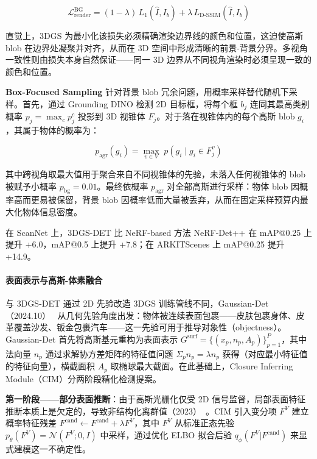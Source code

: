 \begin{equation}
\label{eq:10_bg_loss}
\mathcal{L}_{\text{render}}^{\text{BG}} = (1-\lambda)\, L_1(\hat{I}, I_b) + \lambda\, L_{\text{D-SSIM}}(\hat{I}, I_b)
\end{equation}

直觉上，3DGS 为最小化该损失必须精确渲染边界线的颜色和位置，这迫使高斯 blob 在边界处凝聚并对齐，从而在 3D 空间中形成清晰的前景-背景分界。多视角一致性则由损失本身自然保证——同一 3D 边界从不同视角渲染时必须呈现一致的颜色和位置。

\textbf{Box-Focused Sampling} 针对背景 blob 冗余问题，用概率采样替代随机下采样。首先，通过 Grounding DINO 检测 2D 目标框，将每个框 $b_j$ 连同其最高类别概率 $p_j = \max_c p^c_j$ 投影到 3D 视锥体 $F_j$。对于落在视锥体内的每个高斯 blob $g_i$，其属于物体的概率为：

\begin{equation}
\label{eq:10_prob_agg}
p_{\text{agr}}(g_i) = \max_{v \in V}\; p(g_i \mid g_i \in F_j^v)
\end{equation}

其中跨视角取最大值用于聚合来自不同视锥体的先验，未落入任何视锥体的 blob 被赋予小概率 $p_{\text{bg}}=0.01$。最终依概率 $p_{\text{agr}}$ 对全部高斯进行采样：物体 blob 因概率高而更易被保留，背景 blob 因概率低而大量被丢弃，从而在固定采样预算内最大化物体信息密度。

在 ScanNet 上，3DGS-DET 比 NeRF-based 方法 NeRF-Det++ 在 mAP@0.25 上提升 +6.0，mAP@0.5 上提升 +7.8；在 ARKITScenes 上 mAP@0.25 提升 +14.9。

\paragraph{表面表示与高斯-体素融合} 与 3DGS-DET 通过 2D 先验改造 3DGS 训练管线不同，Gaussian-Det（2024.10）~\cite{2410_01404} 从几何先验角度出发：物体被连续表面包裹——皮肤包裹身体、皮革覆盖沙发、钣金包裹汽车——这一先验可用于推导对象性（objectness）。Gaussian-Det 首先将高斯基元重构为表面表示 $G^{\text{surf}} = \{(x_p, n_p, A_p)\}_{p=1}^P$，其中法向量 $n_p$ 通过求解协方差矩阵的特征值问题 $\Sigma_p n_p = \lambda n_p$ 获得（对应最小特征值的特征向量），横截面积 $A_p$ 取椭球最大截面。在此基础上，Closure Inferring Module（CIM）分两阶段精化检测提案。

\textbf{第一阶段——部分表面推断}：由于高斯光栅化仅受 2D 信号监督，局部表面特征推断本质上是欠定的，导致非结构化离群值（2023）~\cite{2023_sugar}。CIM 引入变分项 $F^V$ 建立概率特征残差 $F^{\text{cand}} \leftarrow F^{\text{cand}} + \lambda F^V$，其中 $F^V$ 从标准正态先验 $p_\theta(F^V) = \mathcal{N}(F^V; 0, I)$ 中采样，通过优化 ELBO 拟合后验 $q_\phi(F^V|F^{\text{cand}})$ 来显式建模这一不确定性。

